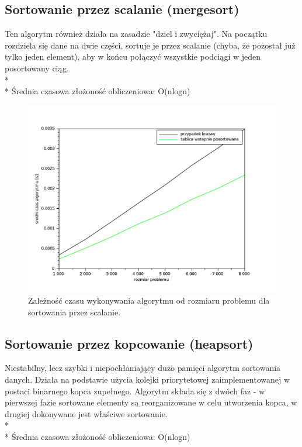 \documentclass{mwart}
\begin{document}
\newpage
\subsection {Sortowanie przez scalanie (mergesort)}
Ten algorytm również działa na zasadzie "dziel i zwyciężaj". Na początku rozdziela się dane na dwie części, sortuje je przez scalanie (chyba, że pozostał już tylko jeden element), aby w końcu połączyć wszystkie podciągi w jeden posortowany ciąg.
\\*\\*
Średnia czasowa złożoność obliczeniowa: O(nlogn)

\begin{figure}[!htp]
\centering
\includegraphics[width=\textwidth]{files/merge.pdf}
\caption{Zależność czasu wykonywania algorytmu od rozmiaru problemu dla sortowania przez scalanie. \label{merge}} 
\end{figure}


\newpage
\subsection {Sortowanie przez kopcowanie (heapsort)}
Niestabilny, lecz szybki i niepochłaniający dużo pamięci algorytm sortowania danych. Działa na podstawie użycia kolejki priorytetowej zaimplementowanej w postaci binarnego kopca zupełnego. Algorytm składa się z dwóch faz - w pierwszej fazie sortowane elementy są reorganizowane w celu utworzenia kopca, w drugiej dokonywane jest właściwe sortowanie.
\\*\\*
Średnia czasowa złożoność obliczeniowa: O(nlogn)
\end{document}
